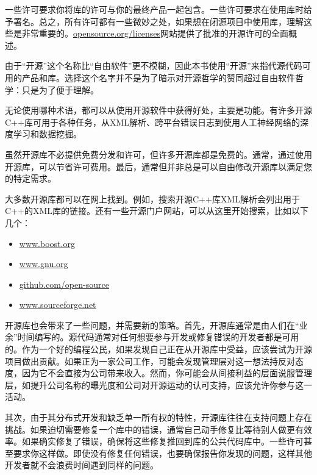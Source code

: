 一些许可要求你将库的许可与你的最终产品一起包含。一些许可要求在使用库时给予署名。总之，所有许可都有一些微妙之处，如果想在闭源项目中使用库，理解这些是非常重要的。\url{opensource.org/licenses}网站提供了批准的开源许可的全面概述。

由于“开源”这个名称比“自由软件”更不模糊，因此本书使用“开源”来指代源代码可用的产品和库。选择这个名字并不是为了暗示对开源哲学的赞同超过自由软件哲学：只是为了便于理解。


无论使用哪种术语，都可以从使用开源软件中获得好处，主要是功能。有许多开源C++库可用于各种任务，从XML解析、跨平台错误日志到使用人工神经网络的深度学习和数据挖掘。

虽然开源库不必提供免费分发和许可，但许多开源库都是免费的。通常，通过使用开源库，可以节省许可费用。最后，通常但并非总是可以自由修改开源库以满足您的特定需求。

大多数开源库都可以在网上找到。例如，搜索开源C++库XML解析会列出用于C++的XML库的链接。还有一些开源门户网站，可以从这里开始搜索，比如以下几个：

\begin{itemize}
\item
\url{www.boost.org}

\item
\url{www.gnu.org}

\item
\url{github.com/open-source}

\item
\url{www.sourceforge.net}
\end{itemize}


开源库也会带来了一些问题，并需要新的策略。首先，开源库通常是由人们在“业余”时间编写的。源代码通常对任何想要参与开发或修复错误的开发者都是可用的。作为一个好的编程公民，如果发现自己正在从开源库中受益，应该尝试为开源项目做出贡献。如果正为一家公司工作，可能会发现管理层对这一想法持反对态度，因为它不会直接为公司带来收入。然而，你可能会从间接利益的层面说服管理层，如提升公司名称的曝光度和公司对开源运动的认可支持，应该允许你参与这一活动。

其次，由于其分布式开发和缺乏单一所有权的特性，开源库往往在支持问题上存在挑战。如果迫切需要修复一个库中的错误，通常自己动手修复比等待别人做更有效率。如果确实修复了错误，确保将这些修复推回到库的公共代码库中。一些许可甚至要求你这样做。即使没有修复任何错误，也要确保报告你发现的问题，这样其他开发者就不会浪费时间遇到同样的问题。


